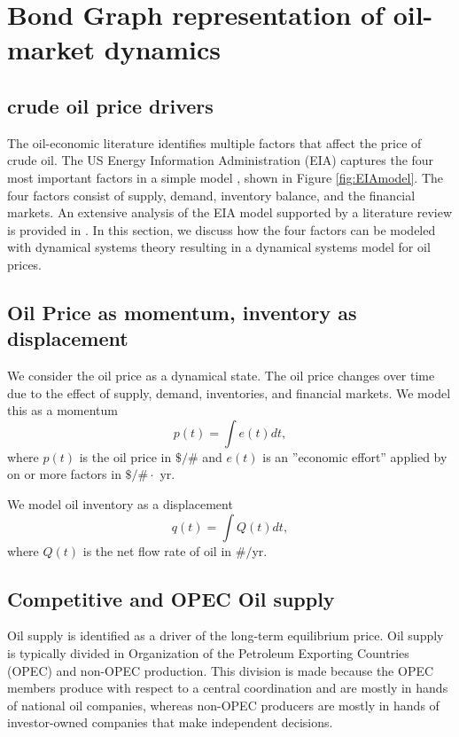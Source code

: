 \section{Bond Graph representation of oil-market dynamics}
\label{sec: EconEng}

\subsection{crude oil price drivers}
The oil-economic literature identifies multiple factors that affect the price of crude oil.
The US Energy Information Administration (EIA) captures the four most important factors in a simple model \cite{eia}, shown in Figure \ref{fig:EIAmodel}.
The four factors consist of supply, demand, inventory balance, and the financial markets.
An extensive analysis of the EIA model supported by a literature review is provided in \cite{Lang2020}.
In this section, we discuss how the four factors can be modeled with dynamical systems theory resulting in a dynamical systems model for oil prices.




\subsection{Oil Price as momentum, inventory as displacement}
We consider the oil price as a dynamical state.
The oil price changes over time due to the effect of supply, demand, inventories, and financial markets.
We model this as a momentum
\begin{equation}
\label{eq: pdot}
    {p}(t) = \int e(t) dt,
\end{equation}
where $p(t)$ is  the oil price in $\$/\#$ and $e(t)$ is an ''economic effort'' applied by on or more factors in $\$/\#\cdot$ yr.

We model oil inventory as a displacement
\begin{equation}
    \label{eq: qdot}
 q(t) = \int Q (t) dt,
\end{equation}
where $Q(t)$ is the net flow rate of oil in $\#/$yr. 


\subsection{Competitive and OPEC Oil supply}
Oil supply is identified as a driver of the long-term equilibrium price.
Oil supply is typically divided in Organization of the Petroleum Exporting Countries (OPEC) and non-OPEC production.
This division is made because the OPEC members produce with respect to a central coordination and are mostly in hands of national oil companies, whereas non-OPEC producers are mostly in hands of investor-owned companies that make independent decisions.

